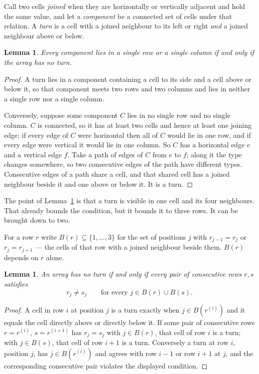 \documentclass[11pt,a4paper]{article}
\theoremstyle{plain}
\newtheorem{lemma}[theorem]{Lemma}
\theoremstyle{definition}
\begin{document}
Call two cells \emph{joined} when they are horizontally or vertically adjacent and hold the same value, and let a \emph{component} be a connected set of cells under that relation. A \emph{turn} is a cell with a joined neighbour to its left or right \emph{and} a joined neighbour above or below.

\begin{lemma}\label{lem:turn}
Every component lies in a single row or a single column if and only if the array has no turn.
\end{lemma}

\begin{proof}
A turn lies in a component containing a cell to its side and a cell above or below it, so that component meets two rows and two columns and lies in neither a single row nor a single column.

Conversely, suppose some component $C$ lies in no single row and no single column. $C$ is connected, so it has at least two cells and hence at least one joining edge; if every edge of $C$ were horizontal then all of $C$ would lie in one row, and if every edge were vertical it would lie in one column. So $C$ has a horizontal edge $e$ and a vertical edge $f$. Take a path of edges of $C$ from $e$ to $f$; along it the type changes somewhere, so two consecutive edges of the path have different types. Consecutive edges of a path share a cell, and that shared cell has a joined neighbour beside it and one above or below it. It is a turn.
\end{proof}

The point of Lemma~\ref{lem:turn} is that a turn is visible in one cell and its four neighbours. That already bounds the condition, but it bounds it to three rows. It can be brought down to two.

For a row $r$ write $B(r)\subseteq\{1,\dots,3\}$ for the set of positions $j$ with $r_{j-1}=r_j$ or $r_j=r_{j+1}$ --- the cells of that row with a joined neighbour beside them. $B(r)$ depends on $r$ alone.

\begin{lemma}\label{lem:pair}
An array has no turn if and only if every pair of consecutive rows $r,s$ satisfies
\[ r_j \neq s_j \qquad\text{for every } j \in B(r)\cup B(s). \]
\end{lemma}

\begin{proof}
A cell in row $i$ at position $j$ is a turn exactly when $j\in B(r^{(i)})$ and it equals the cell directly above or directly below it. If some pair of consecutive rows $r=r^{(i)}$, $s=r^{(i+1)}$ has $r_j=s_j$ with $j\in B(r)$, that cell of row $i$ is a turn; with $j\in B(s)$, that cell of row $i+1$ is a turn. Conversely a turn at row $i$, position $j$, has $j\in B(r^{(i)})$ and agrees with row $i-1$ or row $i+1$ at $j$, and the corresponding consecutive pair violates the displayed condition.
\end{proof}
\end{document}
